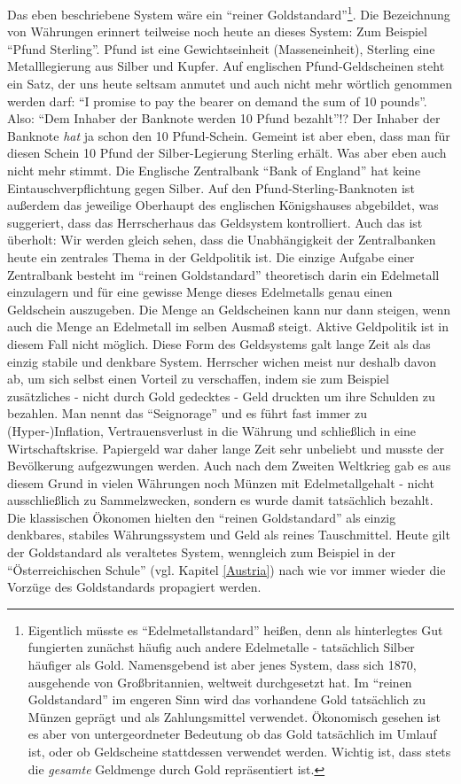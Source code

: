 Das eben beschriebene System wäre ein "`reiner Goldstandard"'\footnote{Eigentlich müsste es "`Edelmetallstandard"' heißen, denn als hinterlegtes Gut fungierten zunächst häufig auch andere Edelmetalle - tatsächlich Silber häufiger als Gold. Namensgebend ist aber jenes System, dass sich 1870, ausgehende von Großbritannien, weltweit durchgesetzt hat. Im "`reinen Goldstandard"' im engeren Sinn wird das vorhandene Gold tatsächlich zu Münzen geprägt und als Zahlungsmittel verwendet. Ökonomisch gesehen ist es aber von untergeordneter Bedeutung ob das Gold tatsächlich im Umlauf ist, oder ob Geldscheine stattdessen verwendet werden. Wichtig ist, dass stets die \textit{gesamte} Geldmenge durch Gold repräsentiert ist.}. Die Bezeichnung von Währungen erinnert teilweise noch heute an dieses System: Zum Beispiel "`Pfund Sterling"'. Pfund ist eine Gewichtseinheit (Masseneinheit), Sterling eine Metalllegierung aus Silber und Kupfer. Auf englischen Pfund-Geldscheinen steht ein Satz, der uns heute seltsam anmutet und auch nicht mehr wörtlich genommen werden darf: "`I promise to pay the bearer on demand the sum of 10 pounds"'. Also: "`Dem Inhaber der Banknote werden 10 Pfund bezahlt"'!? Der Inhaber der Banknote \textit{hat} ja schon den 10 Pfund-Schein. Gemeint ist aber eben, dass man für diesen Schein 10 Pfund der Silber-Legierung Sterling erhält. Was aber eben auch nicht mehr stimmt. Die Englische Zentralbank "`Bank of England"' hat keine Eintauschverpflichtung gegen Silber. Auf den Pfund-Sterling-Banknoten ist außerdem das jeweilige Oberhaupt des englischen Königshauses abgebildet, was suggeriert, dass das Herrscherhaus das Geldsystem kontrolliert. Auch das ist überholt: Wir werden gleich sehen, dass die Unabhängigkeit der Zentralbanken heute ein zentrales Thema in der Geldpolitik ist. Die einzige Aufgabe einer Zentralbank besteht im "`reinen Goldstandard"' theoretisch darin ein Edelmetall einzulagern und für eine gewisse Menge dieses Edelmetalls genau einen Geldschein auszugeben. Die Menge an Geldscheinen kann nur dann steigen, wenn auch die Menge an Edelmetall im selben Ausmaß steigt. Aktive Geldpolitik ist in diesem Fall nicht möglich. Diese Form des Geldsystems galt lange Zeit als das einzig stabile und denkbare System. Herrscher wichen meist nur deshalb davon ab, um sich selbst einen Vorteil zu verschaffen, indem sie zum Beispiel zusätzliches - nicht durch Gold gedecktes - Geld druckten um ihre Schulden zu bezahlen. Man nennt das "`Seignorage"' und es führt fast immer zu (Hyper-)Inflation, Vertrauensverlust in die Währung und schließlich in eine Wirtschaftskrise. Papiergeld war daher lange Zeit sehr unbeliebt und musste der Bevölkerung aufgezwungen werden. Auch nach dem Zweiten Weltkrieg gab es aus diesem Grund in vielen Währungen noch Münzen mit Edelmetallgehalt - nicht ausschließlich zu Sammelzwecken, sondern es wurde damit tatsächlich bezahlt. Die klassischen Ökonomen hielten den "`reinen Goldstandard"' als einzig denkbares, stabiles Währungssystem und Geld als reines Tauschmittel. Heute gilt der Goldstandard als veraltetes System, wenngleich zum Beispiel in der "`Österreichischen Schule"' (vgl. Kapitel \ref{Austria}) nach wie vor immer wieder die Vorzüge des Goldstandards propagiert werden.  

